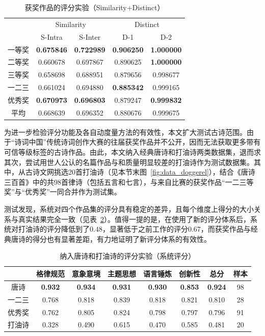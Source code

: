\begin{table}[ht]
  \centering
  \caption{获奖作品的评分实验（Similarity+Distinct）}
  \label{tab:test_scoring_prized_dsr1_2}
  \begin{tabular}{ccccc}
      \toprule
      & \multicolumn{2}{c}{Similarity} & \multicolumn{2}{c}{Distinct}\\
      \cmidrule(r){2-3} \cmidrule(l){4-5} 
      & S-Intra& S-Inter& D-1& D-2\\
      \midrule
      一等奖&	\bf{0.675846} 	&	\bf{0.722989} 	&	\bf{0.906250} 	&	\bf{1.000000} 	\\
      二等奖&	0.660678 	&	0.697867 	&	0.890625 	&	\bf{1.000000} \\
      三等奖&	0.658698 	&	0.688951 	&	0.879656 	&	0.998677 	\\
      \cmidrule{2-5} %
      一二三&	0.661024 	&	0.694880 	&	\bf{0.885342} 	&	0.999165 \\
      优秀奖&	\bf{0.670973} 	&	\bf{0.696803} 	&	0.879247 	&	\bf{0.999832} 	\\
      
      \cmidrule{2-5} %
      平均&	0.668639 	&	0.696352 	&	0.880676 	&	0.999675 	\\

      \bottomrule
  \end{tabular}
\end{table}

为进一步检验评分功能及各自动度量方法的有效性，本文扩大测试古诗范围。由于“诗词中国”传统诗词创作大赛的往届获奖作品并不公开，因而无法获取更多带有可信等级标签的古诗作品。由此，本文纳入经典唐诗和打油诗两类数据集，退而求其次，尝试用世人公认的名篇作品与和质量明显较差的打油诗作为测试数据集。其中，从古诗文网挑选20首打油诗（见本节末图~\ref{fig:data_doggerel}），结合《唐诗三百首》中的共98首律诗（包括五言和七言），与来自比赛的获奖作品“一二三等奖”与“优秀奖”一同合并作为测试集。

测试发现，系统对四个作品集的评分具有稳定的差异，且每个维度上得分的大小关系与真实结果完全一致（见表~\ref{tab:test_scoring_all_dsr1_detail}）。值得一提的是，在使用了新的评分体系后，系统对打油诗的评分降低到了$0.48$，显著低于之前工作的评分$0.67$，而获奖作品与经典唐诗的得分也有显著差距，有力地证明了新评分体系的有效性。

\begin{table}[ht]
  \centering
  \caption{纳入唐诗和打油诗的评分实验（系统评分）}
  \label{tab:test_scoring_all_dsr1_detail}
  \begin{tabular}{cccccccc}
      \toprule
      &格律规范& 意象意境& 主题思想& 语言锤炼&创新性& 总分& 样本\\
      \midrule
      唐诗	&	\bf{0.932} 	&	\bf{0.934} 	&	\bf{0.931} 	&	\bf{0.930} 	&	\bf{0.853} 	&	\bf{0.924} 	&	98	\\
      一二三	&	0.768 	&	0.818 	&	0.839 	&	0.818 	&	0.821 	&	0.810 	&	28	\\
      优秀奖	&	0.762 	&	0.805 	&	0.824 	&	0.798 	&	0.797 	&	0.796 	&	91	\\
      打油诗	&	0.328 	&	0.490 	&	0.615 	&	0.470 	&	0.585 	&	0.481 	&	20	\\									
      \bottomrule
  \end{tabular}
\end{table}

